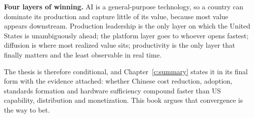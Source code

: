 \textbf{Four layers of winning.} AI is a general-purpose technology, so a country can dominate its production and capture little of its value, because most value appears downstream. Production leadership is the only layer on which the United States is unambiguously ahead; the platform layer goes to whoever opens fastest; diffusion is where most realized value sits; productivity is the only layer that finally matters and the least observable in real time.

The thesis is therefore conditional, and Chapter~\ref{c:summary} states it in its final form with the evidence attached: whether Chinese cost reduction, adoption, standards formation and hardware sufficiency compound faster than US capability, distribution and monetization. This book argues that convergence is the way to bet.
